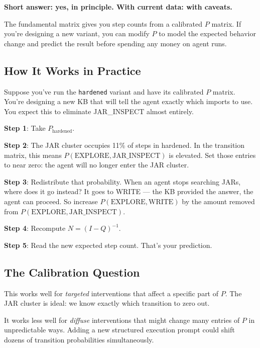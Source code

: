 \documentclass[11pt,a4paper]{article}
\begin{document}
\begin{keybox}
\textbf{Short answer: yes, in principle. With current data: with caveats.}
\end{keybox}

The fundamental matrix gives you step counts from a calibrated $P$ matrix.
If you're designing a new variant,
you can modify $P$ to model the expected behavior change and predict the result
before spending any money on agent runs.

\subsection*{How It Works in Practice}

Suppose you've run the \texttt{hardened} variant and have its calibrated $P$ matrix.
You're designing a new KB that will tell the agent exactly which imports to use.
You expect this to eliminate JAR\_INSPECT almost entirely.

\textbf{Step 1}: Take $P_{\text{hardened}}$.

\textbf{Step 2}: The JAR cluster occupies 11\% of steps in hardened.
In the transition matrix, this means $P(\text{EXPLORE}, \text{JAR\_INSPECT})$ is elevated.
Set those entries to near zero: the agent will no longer enter the JAR cluster.

\textbf{Step 3}: Redistribute that probability.
When an agent stops searching JARs, where does it go instead?
It goes to WRITE --- the KB provided the answer, the agent can proceed.
So increase $P(\text{EXPLORE}, \text{WRITE})$ by the amount removed from
$P(\text{EXPLORE}, \text{JAR\_INSPECT})$.

\textbf{Step 4}: Recompute $N = (I-Q)^{-1}$.

\textbf{Step 5}: Read the new expected step count. That's your prediction.

\subsection*{The Calibration Question}

This works well for \emph{targeted} interventions that affect a specific part of $P$.
The JAR cluster is ideal: we know exactly which transition to zero out.

It works less well for \emph{diffuse} interventions that might change many entries of $P$
in unpredictable ways. Adding a new structured execution prompt could shift dozens of
transition probabilities simultaneously.
\end{document}
